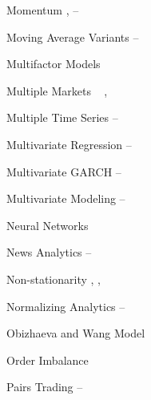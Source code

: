\begin{multicols}{2}
{Momentum \hfill \pageref{in:mom1}, \pageref{in:mom2}--\pageref{in:mom3} \par

Moving Average Variants \hfill \pageref{in:mva1}--\pageref{in:mva2} \par %

Multifactor Models \hfill \pageref{in:mfm1} \par%

Multiple Markets \hfill  \pageref{in:multmark}, \pageref{in:mult_mark} \par

Multiple Time Series \hfill \pageref{in:mts1}--\pageref{in:mts2} \par

Multivariate Regression \hfill \pageref{in:multreg1}--\pageref{in:multreg2} \par %

Multivariate GARCH \hfill \pageref{in:multgarch1}--\pageref{in:multgarch2} \par

Multivariate Modeling \hfill \pageref{in:multimod1}--\pageref{in:multimod2} \par

Neural Networks \hfill \pageref{in:neural_net} \par

News Analytics \hfill \pageref{in:newsan1}--\pageref{in:newsan2} \par

Non-stationarity \hfill \pageref{in:nonstat1}, \pageref{in:nonstat2}, \pageref{in:nonstat3} \par


Normalizing Analytics \hfill \pageref{in:norm1}--\pageref{in:norm2} \par

Obizhaeva and Wang Model \hfill \pageref{in:ob_wang_mod} \par

Order Imbalance \hfill \pageref{in:imbalance} \par

Pairs Trading \hfill \pageref{in:pairs1}--\pageref{in:pairs2} \par

}
\end{multicols}
